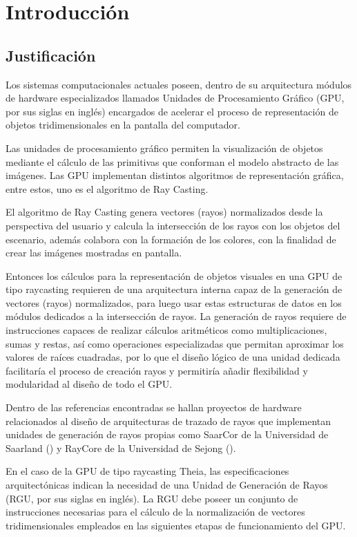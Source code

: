 \chapter{Introducción}

\section{Justificación}
Los sistemas computacionales actuales poseen, dentro de su arquitectura módulos de hardware especializados llamados Unidades de Procesamiento Gráfico (GPU, por sus siglas en inglés) encargados de acelerar el proceso de representación de objetos tridimensionales en la pantalla del computador.

Las unidades de procesamiento gráfico permiten la visualización de objetos mediante el cálculo de las primitivas que conforman el modelo abstracto de las imágenes. Las GPU implementan distintos algoritmos  de representación gráfica, entre estos, uno es el algoritmo de Ray Casting.

El algoritmo de Ray Casting genera vectores (rayos) normalizados desde la perspectiva del usuario y calcula la intersección de los rayos con los objetos del escenario, además colabora con la formación de los colores, con la finalidad de crear las imágenes mostradas en pantalla.

Entonces los cálculos para la representación de objetos visuales en una GPU de tipo raycasting requieren de una arquitectura interna capaz de la generación de vectores (rayos) normalizados,  para luego usar estas estructuras de datos en los módulos dedicados a la intersección de rayos. La generación de rayos requiere de instrucciones capaces de  realizar cálculos aritméticos como multiplicaciones, sumas y restas, así como operaciones especializadas que permitan aproximar los valores de raíces cuadradas, por lo que el diseño lógico de una unidad dedicada facilitaría el proceso de creación rayos y permitiría añadir flexibilidad y modularidad al diseño de todo el GPU. 

Dentro de las referencias encontradas se hallan proyectos de hardware relacionados al diseño de arquitecturas de trazado de rayos que implementan unidades de generación de rayos propias como SaarCor de la Universidad de Saarland (\cite{Schmittler2004}) y RayCore de la Universidad de Sejong (\cite{Nah2014}). 

En el caso de la GPU de tipo raycasting Theia, las especificaciones arquitectónicas indican la necesidad de una Unidad de Generación de Rayos (RGU, por sus siglas en inglés). La RGU debe poseer un conjunto de instrucciones necesarias para el cálculo de la normalización de vectores tridimensionales empleados en las siguientes etapas de funcionamiento del GPU.

